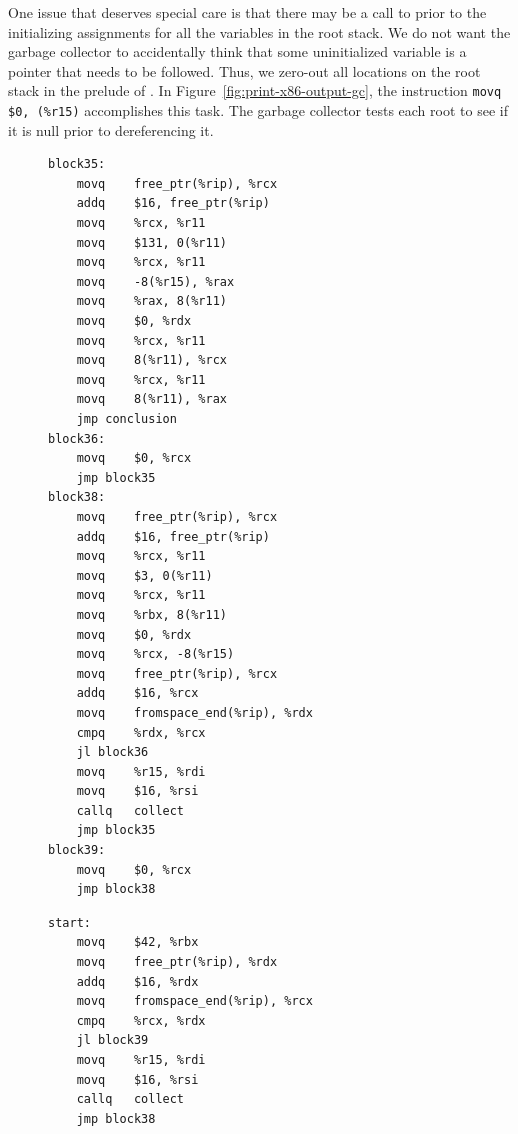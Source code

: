 \documentclass[11pt]{book}
\begin{document}
One issue that deserves special care is that there may be a call to
 prior to the initializing assignments for all the
variables in the root stack. We do not want the garbage collector to
accidentally think that some uninitialized variable is a pointer that
needs to be followed. Thus, we zero-out all locations on the root
stack in the prelude of . In
Figure~\ref{fig:print-x86-output-gc}, the instruction
%
\lstinline{movq $0, (%r15)}
%
accomplishes this task. The garbage collector tests each root to see
if it is null prior to dereferencing it.

\begin{figure}[htbp]
\begin{minipage}[t]{0.5\textwidth}
\begin{lstlisting}[basicstyle=\ttfamily\scriptsize]
block35:
	movq	free_ptr(%rip), %rcx
	addq	$16, free_ptr(%rip)
	movq	%rcx, %r11
	movq	$131, 0(%r11)
	movq	%rcx, %r11
	movq	-8(%r15), %rax
	movq	%rax, 8(%r11)
	movq	$0, %rdx
	movq	%rcx, %r11
	movq	8(%r11), %rcx
	movq	%rcx, %r11
	movq	8(%r11), %rax
	jmp conclusion
block36:
	movq	$0, %rcx
	jmp block35
block38:
	movq	free_ptr(%rip), %rcx
	addq	$16, free_ptr(%rip)
	movq	%rcx, %r11
	movq	$3, 0(%r11)
	movq	%rcx, %r11
	movq	%rbx, 8(%r11)
	movq	$0, %rdx
	movq	%rcx, -8(%r15)
	movq	free_ptr(%rip), %rcx
	addq	$16, %rcx
	movq	fromspace_end(%rip), %rdx
	cmpq	%rdx, %rcx
	jl block36
	movq	%r15, %rdi
	movq	$16, %rsi
	callq	collect
	jmp block35
block39:
	movq	$0, %rcx
	jmp block38
\end{lstlisting}
\end{minipage}
\begin{minipage}[t]{0.45\textwidth}
\begin{lstlisting}[basicstyle=\ttfamily\scriptsize]
start:
	movq	$42, %rbx
	movq	free_ptr(%rip), %rdx
	addq	$16, %rdx
	movq	fromspace_end(%rip), %rcx
	cmpq	%rcx, %rdx
	jl block39
	movq	%r15, %rdi
	movq	$16, %rsi
	callq	collect
	jmp block38
        

\end{lstlisting}
\end{minipage}
\end{figure}
\end{document}

